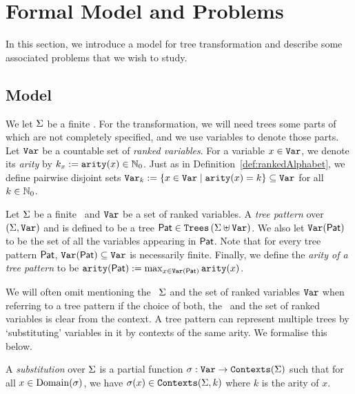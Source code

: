 \section{Formal Model and Problems}\label{sec:formalModelAndProblems_atomicTreeTransform}

In this section, we introduce a model for tree transformation and describe some associated problems that we wish to study.

\subsection{Model}\label{subsec:model_atomicTreeTransform}

We let $\Sigma$ be a finite \rab. For the transformation, we will need trees some parts of which are not completely specified, and we use variables to denote those parts. Let $\texttt{Var}$ be a countable set of \emph{ranked variables}. For a variable $x \in \texttt{Var}$, we denote its \emph{arity} by $k_x := \texttt{arity}(x) \in \mathbb{N}_0$. Just as in Definition~\ref{def:rankedAlphabet}, we define pairwise disjoint sets $\texttt{Var}_k := \left\{ x \in \texttt{Var} \mid \texttt{arity}(x) = k \right\} \subseteq \texttt{Var}$ for all $k \in \mathbb{N}_0$.

\begin{definition}\label{def:treePattern}
    Let $\Sigma$ be a finite \rab\ and $\texttt{Var}$ be a set of ranked variables. A \emph{tree pattern} over $(\Sigma, \texttt{Var})$ and is defined to be a tree $\mathsf{Pat} \in \texttt{Trees}\left(\Sigma \uplus \texttt{Var}\right)$. We also let $\texttt{Var}(\mathsf{Pat})$ to be the set of all the variables appearing in $\mathsf{Pat}$. Note that for every tree pattern $\mathsf{Pat}$, $\texttt{Var}(\mathsf{Pat}) \subseteq \texttt{Var}$ is necessarily finite. Finally, we define the \emph{arity of a tree pattern} to be $\texttt{arity}(\mathsf{Pat}) := \max_{x \in \texttt{Var}(\mathsf{Pat})}\texttt{arity}(x)$. 
\end{definition}

We will often omit mentioning the \rab\ $\Sigma$ and the set of ranked variables $\texttt{Var}$ when referring to a tree pattern if the choice of both, the \rab\ and the set of ranked variables is clear from the context.
A tree pattern can represent multiple trees by `substituting' variables in it by contexts of the same arity. We formalise this below.

\begin{definition}[Substitution]\label{def:substitution}
    A \emph{substitution} over $\Sigma$ is a partial function $\sigma : \texttt{Var} \to \texttt{Contexts}(\Sigma)$ such that for all $x \in \operatorname{Domain}(\sigma)$, we have $\sigma(x) \in \texttt{Contexts}(\Sigma, k)$ where $k$ is the arity of $x$.
\end{definition}

